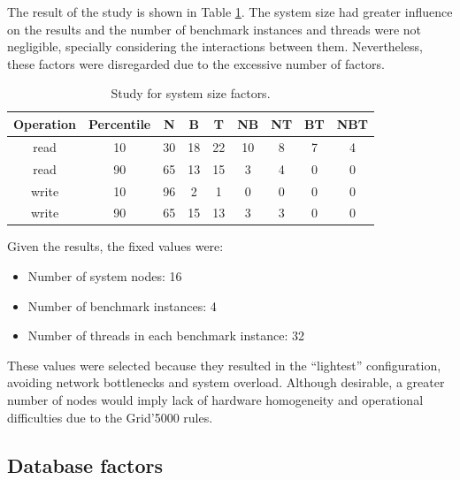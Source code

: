 \documentclass[doublespacing]{bmcart}
\begin{document}
The result of the study is shown in Table
\ref{tab:estudo_para_fatores_de_tamanho_do_sistema}. The system size had greater
influence on the results and the number of benchmark instances and threads were
not negligible, specially considering the interactions between them.
Nevertheless, these factors were disregarded due to the excessive number of
factors.

\begin{table}[h!]
\caption{Study for system size factors.}
\begin{tabular}{ccccccccc} \hline

Operation & Percentile & N & B & T & NB & NT & BT & NBT\\\hline

read & 10 & 30 & 18 & 22 & 10 & 8 & 7 & 4 \\

read & 90 & 65 & 13 & 15 & 3 & 4 & 0 & 0 \\

write & 10 & 96 & 2 & 1 & 0 & 0 & 0 & 0 \\

write & 90 & 65 & 15 & 13 & 3 & 3 & 0 & 0 \\\hline

\end{tabular}
\label{tab:estudo_para_fatores_de_tamanho_do_sistema} \end{table}

Given the results, the fixed values were:

\begin{itemize}

\item Number of system nodes: 16

\item Number of benchmark instances: 4

\item Number of threads in each benchmark instance: 32

\end{itemize}

These values were selected because they resulted in the ``lightest''
configuration, avoiding network bottlenecks and system overload. Although
desirable, a greater number of nodes would imply lack of hardware homogeneity
and operational difficulties due to the Grid'5000 rules.

\subsection{Database factors}
\end{document}
